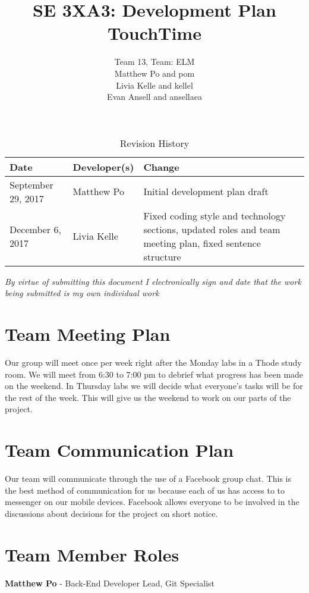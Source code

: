 ﻿\documentclass{article}
\title{SE 3XA3: Development Plan\\TouchTime}
\author{Team 13, Team: ELM
		\\ Matthew Po and pom
		\\ Livia Kelle and kellel
		\\ Evan Ansell and ansellaea
}
\date{}
\begin{document}
\begin{table}[hp]
\caption{Revision History} \label{TblRevisionHistory}
\begin{tabularx}{\textwidth}{llX}
\toprule
\textbf{Date} & \textbf{Developer(s)} & \textbf{Change}\\
\midrule
September 29, 2017 & Matthew Po & Initial development plan draft\\
December 6, 2017 & Livia Kelle & Fixed coding style and technology sections, updated roles and team meeting plan, fixed sentence structure\\
\bottomrule
\end{tabularx}
\end{table}

\newpage

\maketitle
\textit{By virtue of submitting this document I electronically sign and date that the work being submitted is my own individual work}

\section{Team Meeting Plan}

Our group will meet once per week right after the Monday labs in a Thode study room. We will meet from 6:30 to 7:00 pm to debrief what progress has been made on the weekend. In Thursday labs we will decide what everyone’s tasks will be for the rest of the week. This will give us the weekend to work on our parts of the project. 


\section{Team Communication Plan}

Our team will communicate through the use of a Facebook group chat. This is the best method of communication for us because each of us has access to to messenger on our mobile devices. Facebook allows everyone to be involved in the discussions about decisions for the project on short notice. 

\section{Team Member Roles}
\textbf{Matthew Po} - Back-End Developer Lead, Git Specialist
\end{document}
